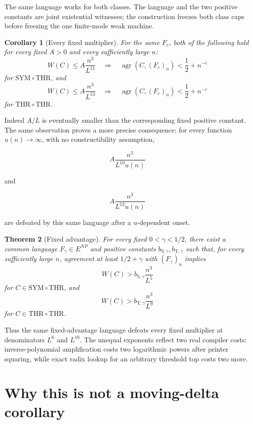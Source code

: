 \documentclass[11pt,letterpaper]{article}
\newtheorem{theorem}{Theorem}[section]
\newtheorem{corollary}[theorem]{Corollary}
\theoremstyle{definition}
\theoremstyle{remark}
\newcommand{\SYMTHR}{\mathrm{SYM}\circ\mathrm{THR}}
\newcommand{\THRTHR}{\mathrm{THR}\circ\mathrm{THR}}
\begin{document}
The same language works for both classes. The language and the two
positive constants are joint existential witnesses; the construction
freezes both class caps before freezing the one finite-mode weak
machine.

\begin{corollary}[Every fixed multiplier]\label{cor:every-multiplier}
For the same \(F_c\),
both of the following hold for every fixed \(A>0\) and every
sufficiently large \(n\): \[
W(C)\le A\frac{n^3}{L^{11}}
\quad\Longrightarrow\quad
\operatorname{agr}(C,(F_c)_n)<\frac12+n^{-c}
\] for \(\mathrm{SYM}\circ\mathrm{THR}\), and \[
W(C)\le A\frac{n^3}{L^{13}}
\quad\Longrightarrow\quad
\operatorname{agr}(C,(F_c)_n)<\frac12+n^{-c}
\] for \(\mathrm{THR}\circ\mathrm{THR}\).
\end{corollary}

Indeed \(A/L\) is eventually smaller than the corresponding fixed
positive constant. The same observation proves a more precise
consequence: for every function \(u(n)\to\infty\), with no
constructibility assumption,

\[
A\frac{n^3}{L^{10}u(n)}
\]

and

\[
A\frac{n^3}{L^{12}u(n)}
\]

are defeated by this same language after a \(u\)-dependent onset.

\begin{theorem}[Fixed advantage]\label{thm:main-fixed}
For every fixed
\(0<\gamma<1/2\), there exist a common language \(F_\gamma\in E^{NP}\)
and positive constants \(b_{\mathrm S,\gamma},b_{\mathrm T,\gamma}\)
such that, for every sufficiently large \(n\), agreement at least
\(1/2+\gamma\) with \((F_\gamma)_n\) implies
\[
W(C)>b_{\mathrm S,\gamma}\frac{n^3}{L^5}
\]
for \(C\in\SYMTHR\), and
\[
W(C)>b_{\mathrm T,\gamma}\frac{n^3}{L^9}
\]
for \(C\in\THRTHR\).
\end{theorem}

Thus the same fixed-advantage language defeats every fixed multiplier at
denominators \(L^6\) and \(L^{10}\). The unequal exponents reflect two
real compiler costs: inverse-polynomial amplification costs two
logarithmic powers after printer squaring, while exact radix lookup for
an arbitrary threshold top costs two more.

\section{Why this is not a moving-delta
corollary}\label{3-why-this-is-not-a-moving-delta-corollary}
\end{document}
